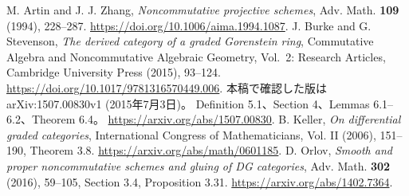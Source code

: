  M. Artin and J. J. Zhang,
\emph{Noncommutative projective schemes}, Adv. Math. \textbf{109} (1994), 228--287.
\url{https://doi.org/10.1006/aima.1994.1087}.
 J. Burke and G. Stevenson,
\emph{The derived category of a graded Gorenstein ring},
Commutative Algebra and Noncommutative Algebraic Geometry, Vol.~2: Research Articles,
Cambridge University Press (2015), 93--124.
\url{https://doi.org/10.1017/9781316570449.006}.
本稿で確認した版はarXiv:1507.00830v1 (2015年7月3日)。
Definition 5.1、Section 4、Lemmas 6.1--6.2、Theorem 6.4。
\url{https://arxiv.org/abs/1507.00830}.
 B. Keller, \emph{On differential graded categories},
International Congress of Mathematicians, Vol. II (2006), 151--190, Theorem 3.8.
\url{https://arxiv.org/abs/math/0601185}.
 D. Orlov,
\emph{Smooth and proper noncommutative schemes and gluing of DG categories},
Adv. Math. \textbf{302} (2016), 59--105, Section 3.4, Proposition 3.31.
\url{https://arxiv.org/abs/1402.7364}.